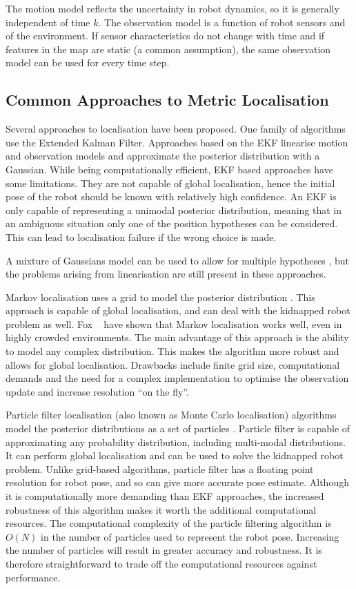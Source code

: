 The motion model reflects the uncertainty in robot dynamics, so it is
generally independent of time $k$. The observation model is a function
of robot sensors and of the environment. If sensor characteristics do
not change with time and if features in the map are static (a common
assumption), the same observation model can be used for every time
step.

\subsection{Common Approaches to Metric Localisation}

Several approaches to localisation have been proposed. One family of
algorithms use the Extended Kalman Filter\cite{Jensfelt99}. Approaches
based on the EKF linearise motion and observation models and
approximate the posterior distribution with a Gaussian. While being
computationally efficient, EKF based approaches have some
limitations. They are not capable of global localisation, hence the
initial pose of the robot should be known with relatively high
confidence. An EKF is only capable of representing a unimodal
posterior distribution, meaning that in an ambiguous situation only
one of the position hypotheses can be considered. This can lead to
localisation failure if the wrong choice is made.

A mixture of Gaussians model can be used to allow for multiple
hypotheses \cite{JensfeltKristensen01,Cox94}, but the problems arising
from linearisation are still present in these approaches.

Markov localisation uses a grid to model the posterior distribution
\cite{Fox99}. This approach is capable of global localisation, and can
deal with the kidnapped robot problem as well. Fox \etal\ \cite{fb99}
have shown that Markov localisation works well, even in highly crowded
environments. The main advantage of this approach is the ability to
model any complex distribution. This makes the algorithm more robust
and allows for global localisation. Drawbacks include finite grid
size, computational demands and the need for a complex implementation
to optimise the observation update and increase resolution ``on the
fly''.

Particle filter localisation (also known as Monte Carlo localisation)
algorithms model the posterior distributions as a set of particles
\cite{Thrun00j, JensfeltAustinWijk00b}. Particle filter is capable of
approximating any probability distribution, including multi-modal
distributions. It can perform global localisation and can be used to
solve the kidnapped robot problem. Unlike grid-based algorithms,
particle filter has a floating point resolution for robot pose, and so
can give more accurate pose estimate. Although it is computationally
more demanding than EKF approaches, the increased robustness of this
algorithm makes it worth the additional computational resources. The
computational complexity of the particle filtering algorithm is $O(N)$
in the number of particles used to represent the robot
pose. Increasing the number of particles will result in greater
accuracy and robustness. It is therefore straightforward to trade off the
computational resources against performance.

